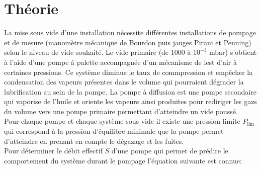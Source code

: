\section{Théorie}

La mise sous vide d'une installation nécessite différentes installations de pompage et de mesure (manomètre mécanique de Bourdon puis jauges Pirani et Penning) selon le niveau de vide souhaité. Le vide primaire (de 1000 à \(10^{-3}\) \si{\milli \bar}) s'obtient à l'aide d'une pompe à palette accompagnée d'un mécanisme de lest d'air à certaines pressions. Ce système diminue le taux de commpression et empêcher la condensation des vapeurs présentes dans le volume qui pourraient dégrader la lubrification au sein de la pompe. La pompe à diffusion est une pompe secondaire qui vaporise de l'huile et oriente les vapeurs ainsi produites pour rediriger les gazs du volume vers une pompe primaire permettant d'atteindre un vide poussé. \\
Pour chaque pompe et chaque système sous vide il existe une pression limite \(P_\textrm{lim}\) qui correspond à la pression d'équilibre minimale que la pompe permet d'atteindre en prenant en compte le dégazage et les fuites. \\
Pour déterminer le débit effectif \(S\) d'une pompe qui permet de prédire le comportement du système durant le pompage l'équation suivante est connue:

